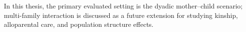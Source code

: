 


In this thesis, the primary evaluated setting is the dyadic mother--child scenario; multi-family interaction is discussed as a future extension for studying kinship, alloparental care, and population structure effects.

